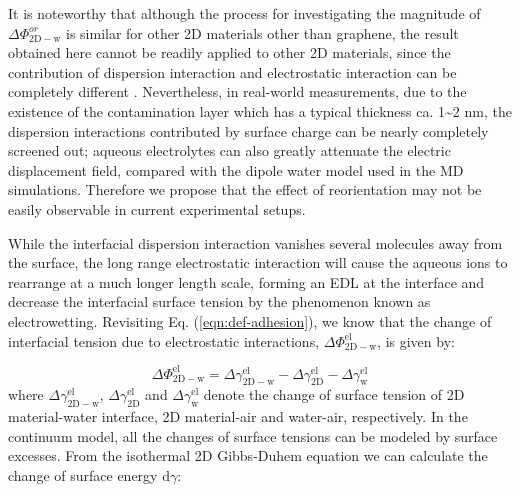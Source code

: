 \documentclass[journal=ancac3,manuscript=article,email=true]{achemso}
\begin{document}
It is noteworthy that although the process for investigating the
magnitude of \(\Delta \Phi_{\mathrm{2D-w}}^{or}\) is similar for other 2D
materials other than graphene, the result obtained here cannot be
readily applied to other 2D materials, since the contribution of
dispersion interaction and electrostatic interaction can be completely
different \cite{Govind_Rajan_2016,Chow_2015}. Nevertheless, in
real-world measurements, due to the existence of the contamination
layer which has a typical thickness ca. 1\textasciitilde{}2 nm, the dispersion
interactions contributed by surface charge can be nearly completely
screened out; aqueous electrolytes can also greatly attenuate the
electric displacement field, compared with the dipole water model used
in the MD simulations. Therefore we propose that the effect of
reorientation may not be easily observable in current experimental
setups.


While the interfacial dispersion interaction vanishes several
molecules away from the surface, the long range electrostatic
interaction will cause the aqueous ions to rearrange at a much longer
length scale, forming an EDL at the interface and decrease the
interfacial surface tension by the phenomenon known as electrowetting.
Revisiting Eq. (\ref{eqn:def-adhesion}), we know that the change of
interfacial tension due to electrostatic interactions, \(\Delta
\Phi_{\mathrm{2D-w}}^{\mathrm{el}}\), is given by:

\begin{equation}
\label{eqn:Delta-Phi-el-def}
\Delta \Phi_{\mathrm{2D-w}}^{\mathrm{el}} = \Delta \gamma_{\mathrm{2D-w}}^{\mathrm{el}}
                                           -\Delta \gamma_{\mathrm{2D}}^{\mathrm{el}}
                                           -\Delta \gamma_{\mathrm{w}}^{\mathrm{el}}
\end{equation}
where \(\Delta \gamma_{\mathrm{2D-w}}^{\mathrm{el}}\), \(\Delta
\gamma_{\mathrm{2D}}^{\mathrm{el}}\) and \(\Delta
\gamma_{\mathrm{w}}^{\mathrm{el}}\) denote the change of surface
tension of 2D material-water interface, 2D material-air and
water-air, respectively. In the continuum model, all the changes of
surface tensions can be modeled by surface excesses. From the
isothermal 2D Gibbs-Duhem equation we can calculate the change of surface
energy \(\mathrm{d} \gamma\):
\end{document}

